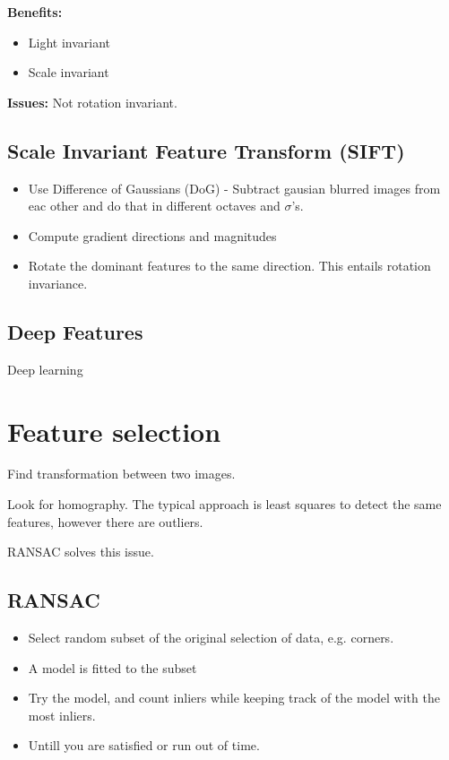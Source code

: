 \documentclass[a4paper]{article}
\begin{document}
\textbf{Benefits:} 
\begin{itemize}
	\item Light invariant
	\item Scale invariant
\end{itemize}


\textbf{Issues:} 
Not rotation invariant.

\subsection{Scale Invariant Feature Transform (SIFT)}
\begin{itemize}
	\item Use Difference of Gaussians (DoG) - Subtract gausian blurred images from eac other and do that in different octaves and $ \sigma $'s. 
	\item Compute gradient directions and magnitudes
	\item Rotate the dominant features to the same direction. This entails rotation invariance.
\end{itemize}

\subsection{Deep Features}
Deep learning


\section{Feature selection}
Find transformation between two images.

Look for homography.
The typical approach is least squares to detect the same features, however there are outliers.

RANSAC solves this issue.

\subsection{RANSAC}
\begin{itemize}
	\item Select random subset of the original selection of data, e.g. corners.
	\item A model is fitted to the subset
	\item Try the model, and count inliers while keeping track of the model with the most inliers.
	\item Untill you are satisfied or run out of time.
\end{itemize}
\end{document}
